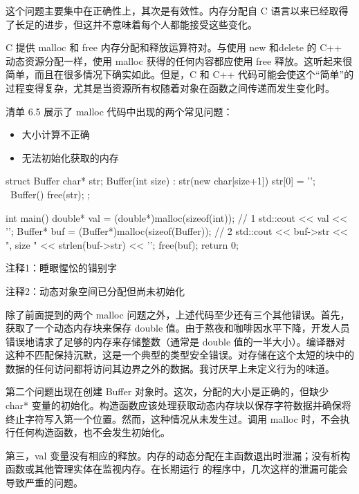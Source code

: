 这个问题主要集中在正确性上，其次是有效性。内存分配自 C 语言以来已经取得了长足的进步，但这并不意味着每个人都能接受这些变化。


C 提供 malloc 和 free 内存分配和释放运算符对。与使用 new 和delete 的 C++ 动态资源分配一样，使用 malloc 获得的任何内容都应使用 free 释放。这听起来很简单，而且在很多情况下确实如此。但是，C 和 C++ 代码可能会使这个“简单”的过程变得复杂，尤其是当资源所有权随着对象在函数之间传递而发生变化时。

清单 6.5 展示了 malloc 代码中出现的两个常见问题：

\begin{itemize}
\item
大小计算不正确

\item
无法初始化获取的内存
\end{itemize}


\begin{cpp}
struct Buffer {
  char* str;
  Buffer(int size) : str(new char[size+1]) { str[0] = '\0'; }
  ~Buffer() { free(str); }
};

int main() {
  double* val = (double*)malloc(sizeof(int)); // 1
  std::cout << val << '\n';
  Buffer* buf = (Buffer*)malloc(sizeof(Buffer)); // 2
  std::cout << buf->str << ", size " << strlen(buf->str) << '\n';
  free(buf);
  return 0;
}
\end{cpp}

{\footnotesize
注释1：睡眼惺忪的错别字

注释2：动态对象空间已分配但尚未初始化
}


除了前面提到的两个 malloc 问题之外，上述代码至少还有三个其他错误。首先，获取了一个动态内存块来保存 double 值。由于熬夜和咖啡因水平下降，开发人员错误地请求了足够的内存来存储整数（通常是 double 值的一半大小）。编译器对这种不匹配保持沉默，这是一个典型的类型安全错误。对存储在这个太短的块中的数据的任何访问都将访问其边界之外的数据。我讨厌早上未定义行为的味道。

第二个问题出现在创建 Buffer 对象时。这次，分配的大小是正确的，但缺少 char* 变量的初始化。构造函数应该处理获取动态内存块以保存字符数据并确保将终止字符写入第一个位置。然而，这种情况从未发生过。调用 malloc 时，不会执行任何构造函数，也不会发生初始化。

第三，val 变量没有相应的释放。内存的动态分配在主函数退出时泄漏；没有析构函数或其他管理实体在监视内存。在长期运行 的程序中，几次这样的泄漏可能会导致严重的问题。

